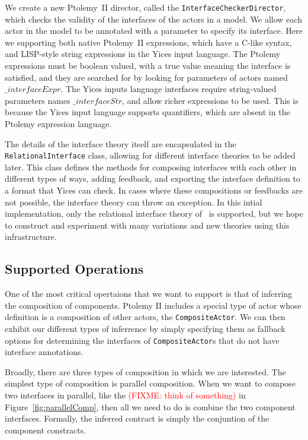 \documentclass[preprint,11pt]{sigplanconf}
\newcommand{\fixme}[1]{\textcolor{red}{(FIXME: #1)}}
\begin{document}
We create a new Ptolemy~II director, called the
\texttt{InterfaceCheckerDirector}, which checks the validity of the interfaces of
the actors in a model. We allow each actor in the model to be annotated with a
parameter to specify its interface. Here we supporting both native Ptolemy~II
expressions, which have a C-like syntax, and LISP-style string expressions in the
Yices input language. The Ptolemy expressions must be boolean valued, with a true
value meaning the interface is satisfied, and they are searched for by looking
for parameters of actors named $\_interfaceExpr$. The Yices inputs language
interfaces require string-valued parameters names $\_interfaceStr$, and allow
richer expressions to be used. This is because the Yices input language supports
quantifiers, which are absent in the Ptolemy expression language.

The details of the interface theory itself are encapsulated in the
\texttt{RelationalInterface} class, allowing for different interface theories
to be added later.  This class defines the methods for composing interfaces
with each other in different types of ways, adding feedback, and exporting the
interface definition to a format that Yices can check. In cases where these
compositions or feedbacks are not possible, the interface theory can throw an
exception.
%
In this intial implementation, only the relational interface theory
of~\cite{relationalInterfaces} is supported, but we hope to construct and
experiment with many variations and new theories using this infrastructure.

\subsection{Supported Operations}
One of the most critical opertaions that we want to support is that of
inferring the composition of components.  Ptolemy II includes a special type
of actor whose definition is a composition of other actors, the
\texttt{CompositeActor}. We can then exhibit our different types of inferrence
by simply specifying them as fallback options for determining the interfaces of
\texttt{CompositeActor}s that do not have interface annotations.

Broadly, there are three types of composition in which we are interested.
%
The simplest type of composition is parallel composition.  When we want to
compose two interfaces in parallel, like the \fixme{think of something} in
Figure~\ref{fig:parallelComp}, then all we need to do is combine the two
component interfaces.  Formally, the inferred contract is simply the conjuntion
of the component constracts.
\end{document}
